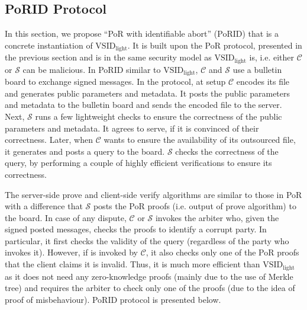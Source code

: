 

\subsection{PoRID Protocol}

In this section, we propose ``PoR with identifiable abort'' (PoRID) that is a concrete instantiation of $\text{VSID}_{\scriptscriptstyle\text{light}}$. It is built upon the PoR protocol, presented in the previous section and is in the same security model as $\text{VSID}_{\scriptscriptstyle\text{light}}$ is, i.e. either $\mathcal C$ or $\mathcal S$ can be malicious. In PoRID similar to $\text{VSID}_{\scriptscriptstyle\text{light}}$, $\mathcal C$ and $\mathcal S$ use a bulletin board to exchange signed messages.  In the protocol, at setup $\mathcal C$ encodes its file and generates public parameters and  metadata.  It posts the public parameters and metadata to the bulletin board and   sends the encoded file to the server. Next, $\mathcal S$ runs a few lightweight checks to ensure the correctness of the public parameters and metadata. It agrees to serve, if it is convinced of their correctness. Later, when $\mathcal C$ wants to ensure the availability of its outsourced file, it  generates and posts a query  to the board.   $\mathcal S$  checks the correctness of the query, by performing a couple of highly efficient verifications to ensure its correctness. 

The server-side prove and client-side verify algorithms are similar to those in PoR with a difference that $\mathcal S$ posts the PoR proofs (i.e. output of prove algorithm) to the board. In  case of any dispute, $\mathcal C$ or $\mathcal S$ invokes the arbiter who, given the signed posted messages, checks the proofs  to identify a corrupt party. In particular,  it first checks the validity of the query (regardless of the party who invokes it). However, if  is invoked by  $\mathcal C$, it also checks  only one of the PoR proofs that the client claims it is invalid. Thus, it is much more efficient than $\text{VSID}_{\scriptscriptstyle\text{light}}$ as it does not need any zero-knowledge proofs (mainly due to the use of Merkle tree) and requires the  arbiter to check only one of the proofs (due  to the idea of proof of misbehaviour). PoRID protocol is presented below.





